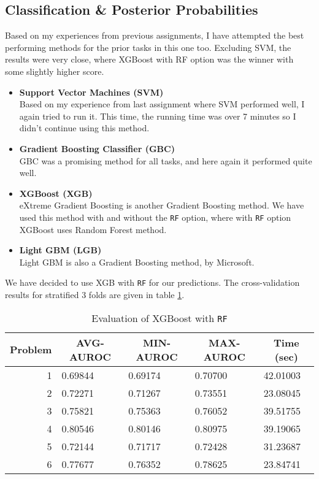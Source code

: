 \documentclass[11pt,reqno]{amsart}
\newcommand{\code}[1]{\texttt{#1}}
\begin{document}
\subsection{Classification \& Posterior Probabilities}
Based on my experiences from previous assignments, I have attempted the best performing methods for the prior tasks in this one too. Excluding SVM, the results were very close, where XGBoost with RF option was the winner with some slightly higher score.
\begin{itemize}
	\item \textbf{Support Vector Machines (SVM)} \\
	Based on my experience from last assignment where SVM performed well, I again tried to run it. This time, the running time was over 7 minutes so I didn't continue using this method.
	\item \textbf{Gradient Boosting Classifier (GBC)} \\
     GBC was a promising method for all tasks, and here again it performed quite well.
	\item \textbf{XGBoost (XGB)} \\
	eXtreme Gradient Boosting is another Gradient Boosting method. We have used this method with and without the \code{RF} option, where with \code{RF} option XGBoost uses Random Forest method.
	\item \textbf{Light GBM (LGB)} \\
	Light GBM is also a Gradient Boosting method, by Microsoft.
\end{itemize}
 
 We have decided to use XGB with \code{RF} for our predictions. The cross-validation results for stratified 3 folds are given in table \ref{tablee}.
 \begin{table}[h]
\begin{tabular}{|c|l|l|l|l|}
\hline
Problem & \multicolumn{1}{c|}{AVG-AUROC} & \multicolumn{1}{c|}{MIN-AUROC} & \multicolumn{1}{c|}{MAX-AUROC} & \multicolumn{1}{c|}{Time (sec)} \\ \hline
\multicolumn{1}{|r|}{1} & 0.69844 & 0.69174 & 0.70700 & 42.01003 \\ \hline
\multicolumn{1}{|r|}{2} & 0.72271 & 0.71267 & 0.73551 & 23.08045 \\ \hline
\multicolumn{1}{|r|}{3} & 0.75821 & 0.75363 & 0.76052 & 39.51755 \\ \hline
\multicolumn{1}{|r|}{4} & 0.80546 & 0.80146 & 0.80975 & 39.19065 \\ \hline
\multicolumn{1}{|r|}{5} & 0.72144 & 0.71717 & 0.72428 & 31.23687 \\ \hline
\multicolumn{1}{|r|}{6} & 0.77677 & 0.76352 & 0.78625 & 23.84741 \\ \hline
\end{tabular}
\caption{Evaluation of XGBoost with \code{RF}}
\label{tablee}
\end{table}
\end{document}
